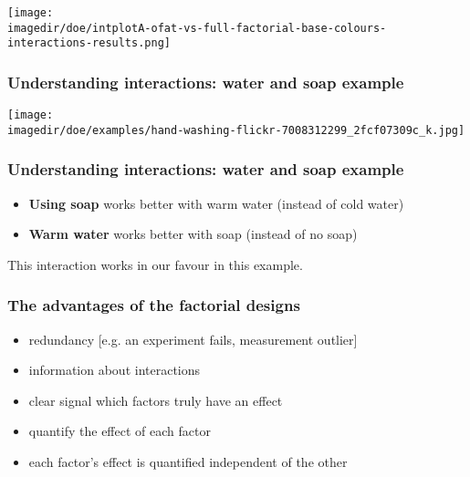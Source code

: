 \documentclass[11pt,aspectratio=169,mathserif]{beamer}
\begin{document}
\begin{frame}\frametitle{}
	\centerline{\texttt{[image: \\imagedir/doe/intplotA-ofat-vs-full-factorial-base-colours-interactions-results.png]}}
\end{frame}

\begin{frame}\frametitle{Understanding interactions: water and soap example}
	\begin{center}
		\texttt{[image: \\imagedir/doe/examples/hand-washing-flickr-7008312299\_2fcf07309c\_k.jpg]}
	\end{center}
	\vspace{-4cm}
\end{frame}
\begin{frame}\frametitle{Understanding interactions: water and soap example}
	
	\large
	\begin{itemize}
		\item	\textbf{Using soap} works better with warm water (instead of cold water)

		
		\vspace{24pt}
		\item	\textbf{Warm water} works better with soap (instead of no soap)
			
	\end{itemize}

	\vspace{24pt}
	This interaction works in our favour in this example.
\end{frame}
\begin{frame}\frametitle{The advantages of the factorial designs}
	\begin{itemize}
		\item	redundancy [e.g. an experiment fails, measurement outlier]
		
		\item	information about interactions
		
		\item	clear signal which factors truly have an effect 
		
		\item	quantify the effect of each factor
		
		\item 	each factor's effect is quantified independent of the other
	\end{itemize}
\end{frame}
\end{document}
